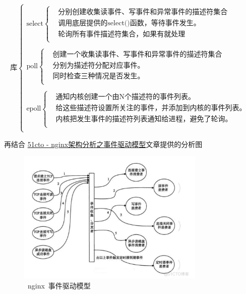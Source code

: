 \documentclass[12pt, a4paper]{article} %
\begin{document}
\begin{CJK*}{UTF8}{gbsn}
\[
    \text{库}
    \begin{cases}
         \text{select}\left\{
            \begin{aligned}
                &\text{分别创建收集读事件、写事件和异常事件的描述符集合}   \\
                &\text{调用底层提供的select()函数，等待事件发生。} \\
                &\text{轮询所有事件描述符集合，如果有就处理} \\
            \end{aligned}
            \right. \\\\
            \text{poll}\left\{
                \begin{aligned}
                    &\text{创建一个收集读事件、写事件和异常事件的描述符集合}   \\
                    &\text{分别为描述符分配对应事件。} \\
                    &\text{同时检查三种情况是否发生。} \\
                \end{aligned}
                \right. \\\\
            \text{epoll}\left\{
                \begin{aligned}
                    &\text{通知内核创建一个由N个描述符的事件列表。}   \\
                    &\text{给这些描述符设置所关注的事件，并添加到内核的事件列表。} \\
                    &\text{内核把发生事件的描述符列表通知给进程，避免了轮询。} \\
                \end{aligned}
                \right. \\
    \end{cases}
\]

再结合 \href{https://blog.51cto.com/yyxianren/5721144}{51cto - nginx架构分析之事件驱动模型}文章提供的分析图

\begin{figure}[htbp]
    \centering
    \includegraphics[width=0.8\textwidth]{./imgs/catch2023-08-19-19.18.04.png}
    \caption{~nginx~事件驱动模型}
\end{figure}


\end{CJK*}
\end{document}
